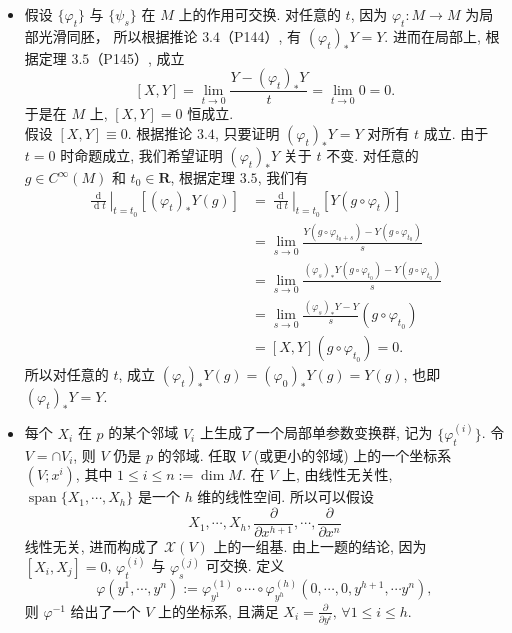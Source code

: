 \begin {itemize}
    \item[30.]
    假设 $\{\varphi_t\}$ 与 $\{\psi_s\}$ 在 $M$ 上的作用可交换. 
    对任意的 $t$, 因为 $\varphi_t \colon M \rightarrow M$ 为局部光滑同胚， 
    所以根据推论 $3.4$（P144）, 有 $(\varphi_t)_* Y = Y$.
    进而在局部上, 根据定理 $3.5$（P145）, 成立
    \[
        [X, Y] = \lim_{t \rightarrow 0} \frac{Y - (\varphi_t)_* Y}{t} = \lim_{t \rightarrow 0} 0 = 0.
    \]
    于是在 $M$ 上, $[X, Y] = 0$ 恒成立.\\
    假设 $[X, Y] \equiv 0$. 根据推论 $3.4$, 只要证明 $(\varphi_t)_* Y = Y$ 对所有 $t$ 成立. 
    由于 $t = 0$ 时命题成立, 我们希望证明 $(\varphi_t)_* Y$ 关于 $t$ 不变. 
    对任意的 $g \in C^\infty(M)$ 和 $t_0 \in \mathbf{R}$, 根据定理 $3.5$, 我们有
    \begin{align*}
        \left. \frac{\operatorname{d}}{\operatorname{d} t}  \right|_{t = t_0} [(\varphi_t)_*Y (g)] & = \left. \frac{\operatorname{d}}{\operatorname{d} t} \right|_{t = t_0} [Y (g \circ \varphi_t)]\\
        & = \lim_{s \rightarrow 0} \frac{Y (g \circ \varphi_{t_0 + s}) - Y (g \circ \varphi_{t_0})}{s}\\
        & = \lim_{s \rightarrow 0} \frac{(\varphi_s)_*Y (g \circ \varphi_{t_0}) - Y (g \circ \varphi_{t_0})}{s}\\
        & = \lim_{s \rightarrow 0} \frac{(\varphi_s)_*Y - Y}{s}(g \circ \varphi_{t_0})\\
        & = [X, Y](g \circ \varphi_{t_0}) = 0.
    \end{align*}
    所以对任意的 $t$, 成立 $(\varphi_t)_* Y(g) = (\varphi_0)_* Y(g) = Y(g)$, 也即 $(\varphi_t)_* Y = Y$.

    \item[31.]
    每个 $X_i$ 在 $p$ 的某个邻域 $V_i$ 上生成了一个局部单参数变换群, 
    记为 $\{\varphi_t^{(i)}\}$. 
    令 $V = \cap V_i$, 则 $V$ 仍是 $p$ 的邻域. 
    任取 $V$ (或更小的邻域) 上的一个坐标系 $(V;x^i)$, 
    其中 $1 \leq i \leq n := \dim M$.
    在 $V$ 上, 由线性无关性, $\operatorname{span}\{X_1, \cdots, X_h\}$ 是一个 $h$ 维的线性空间. 所以可以假设
    \[
        X_1, \cdots, X_h, \frac{\partial}{\partial x^{h+1}}, \cdots, \frac{\partial}{\partial x^n}
    \]
    线性无关, 进而构成了 $\mathscr{X}(V)$ 上的一组基.
    由上一题的结论, 因为 $[X_i, X_j] = 0$, $\varphi_t^{(i)}$ 与 $\varphi_s^{(j)}$ 可交换. 定义
    \[
        \varphi(y^1, \cdots, y^n) := \varphi_{y^1}^{(1)} \circ \cdots \circ \varphi_{y^h}^{(h)}(0, \cdots, 0, y^{h+1}, \cdots y^n),
    \]
    则 $\varphi^{-1}$ 给出了一个 $V$ 上的坐标系, 且满足 
    $X_i = \frac{\partial}{\partial y^i},\, \forall 1 \leq i \leq h$.


\end{itemize}

